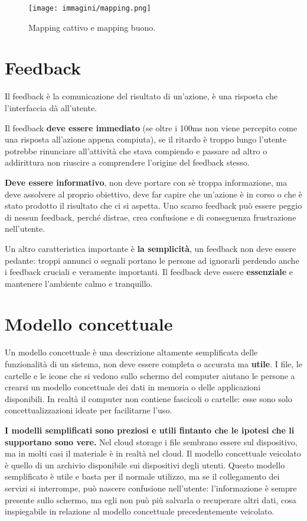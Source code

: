 \begin{figure}[!h]
	\centering
	\texttt{[image: immagini/mapping.png]}
	\caption{Mapping cattivo e mapping buono.}
\end{figure}

\section{Feedback}
Il feedback è la comunicazione del risultato di un'azione, è una risposta che l'interfaccia dà all'utente.

Il feedback \textbf{deve essere immediato} (se oltre i 100ms non viene percepito come una risposta all'azione appena compiuta), se il ritardo è
troppo lungo l'utente potrebbe rinunciare all'attività che stava compiendo e passare ad altro o addirittura non riuscire a comprendere l'origine del
feedback stesso.

\textbf{Deve essere informativo}, non deve portare con sè troppa informazione, ma deve assolvere al proprio obiettivo, deve far capire che un'azione è
in corso o che è stato prodotto il risultato che ci si aspetta. Uno scarso feedback può essere peggio di nessun feedback, perché distrae, crea confusione
e di conseguenza frustrazione nell'utente.

Un altro caratteristica importante è \textbf{la semplicità}, un feedback non deve essere pedante: troppi annunci o segnali portano le persone ad ignorarli
perdendo anche i feedback cruciali e veramente importanti. Il feedback deve essere \textbf{essenziale} e mantenere l'ambiente calmo e tranquillo.

\section{Modello concettuale}
Un modello concettuale è una descrizione altamente semplificata delle funzionalità di un sistema, non deve essere completa o accurata ma \textbf{utile}.
I file, le cartelle e le icone che si vedono sullo schermo del computer aiutano le persone a crearsi un modello concettuale dei dati in memoria o delle
applicazioni disponibili. In realtà il computer non contiene fascicoli o cartelle: esse sono solo concettualizzazioni ideate per facilitarne l'uso.

\textbf{I modelli semplificati sono preziosi e utili fintanto che le ipotesi che li supportano sono vere.} Nel cloud storage i file sembrano essere sul
dispositivo, ma in molti casi il materiale è in realtà nel cloud. Il modello concettuale veicolato è quello di un archivio disponibile sui dispositivi
degli utenti. Questo modello semplificato è utile e basta per il normale utilizzo, ma se il collegamento dei servizi si interrompe, può nascere confusione
nell'utente: l'informazione è sempre presente sullo schermo, ma egli non può più salvarla o recuperare altri dati, cosa inspiegabile in relazione al modello
concettuale precedentemente veicolato.

